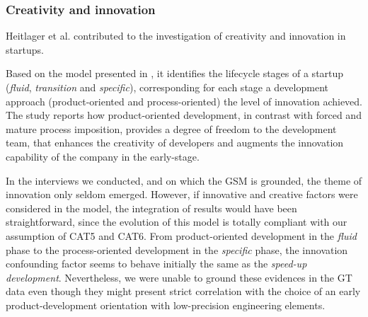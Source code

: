 \documentclass[10pt,journal,letterpaper,compsoc]{IEEEtran}
\begin{document}
\subsubsection{Creativity and innovation} 
Heitlager et al. \cite{Heitlager2007} contributed to the investigation of creativity and innovation in startups. %

Based on the model presented in \cite{Heitlager2007}, it identifies the lifecycle stages of a startup (\textit{fluid}, \textit{transition} and \textit{specific}), corresponding for each stage a development approach (product-oriented and process-oriented) the level of innovation achieved. The study reports how product-oriented development, in contrast with forced and mature process imposition, provides a degree of freedom to the development team, that enhances the creativity of developers and augments the innovation capability of the company in the early-stage.


In the interviews we conducted, and on which the GSM is grounded, the theme of innovation only seldom emerged. However, if innovative and creative factors were considered in the model, the integration of results would have been straightforward, since the evolution of this model is totally compliant with our assumption of CAT5 and CAT6. %
From product-oriented development in the \textit{fluid} phase to the process-oriented development in the \textit{specific} phase, the innovation confounding factor seems to behave initially the same as the \textit{speed-up development}.%
 Nevertheless, we were unable to ground these evidences in the GT data even though they might present strict correlation%
 with the choice of an early product-development orientation with low-precision engineering elements.
\end{document}
